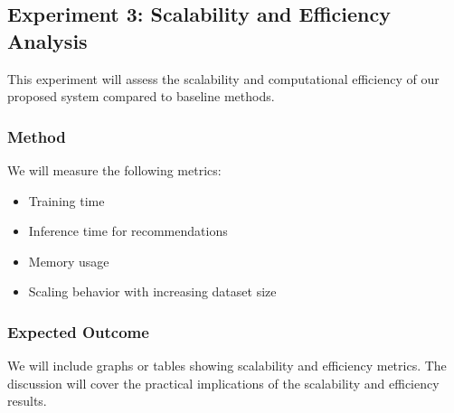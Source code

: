 \documentclass{article}
\begin{document}
\subsection{Experiment 3: Scalability and Efficiency Analysis}

This experiment will assess the scalability and computational efficiency of our proposed system compared to baseline methods.

\subsubsection{Method}
We will measure the following metrics:
\begin{itemize}
    \item Training time
    \item Inference time for recommendations
    \item Memory usage
    \item Scaling behavior with increasing dataset size
\end{itemize}

\subsubsection{Expected Outcome}
We will include graphs or tables showing scalability and efficiency metrics. The discussion will cover the practical implications of the scalability and efficiency results.




\end{document}
